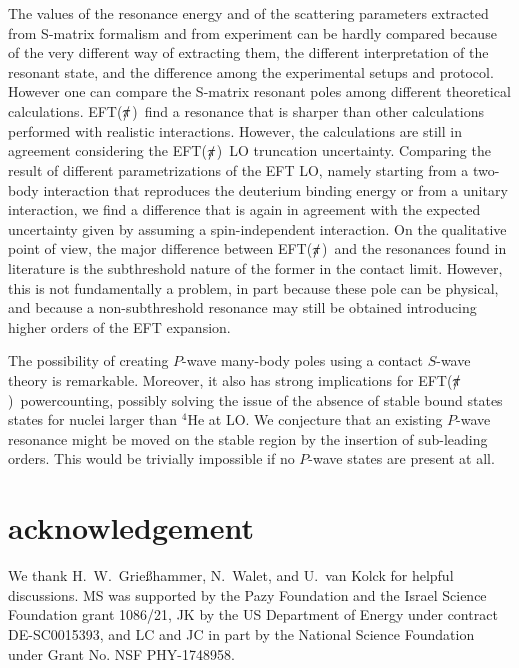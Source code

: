 \documentclass[5p,times]{elsarticle}
\newcommand{\eftnopi}{\mbox{EFT($\slashed{\pi}$) }}
\begin{document}
%
The values of the resonance energy and of the scattering parameters extracted from S-matrix formalism and from experiment can be hardly compared because of the very different way of extracting them, the different interpretation of the resonant state, and the difference among the experimental setups and protocol. 
However one can compare the S-matrix resonant poles among different theoretical calculations. \eftnopi find a resonance that is sharper than other calculations performed with realistic interactions. However, the calculations are still in agreement considering the \eftnopi LO truncation uncertainty. Comparing the result of different parametrizations of the EFT LO, namely starting from a two-body interaction that reproduces the deuterium binding energy or from a unitary interaction, we find a difference that is again in agreement with the expected uncertainty given by assuming a spin-independent interaction.
%
On the qualitative point of view, the major difference between \eftnopi and the resonances found in literature is the subthreshold nature of the former in the contact limit. 
However, this is not fundamentally a problem, in part because these pole can be physical\cite{formartinanyexample}, and because a non-subthreshold resonance may still be obtained introducing higher orders of the EFT expansion.
%

%
The possibility of creating $P$-wave many-body poles using a contact $S$-wave theory is remarkable. 
Moreover, it also has strong implications for \eftnopi powercounting, possibly solving the issue of the absence of stable bound states states for nuclei larger than $^4$He at LO. 
We conjecture that an existing $P$-wave resonance might be moved on the stable region by the insertion of sub-leading orders.
This would be trivially impossible if no $P$-wave states are present at all.

\section*{acknowledgement}
We thank H.~W.~Grie\ss hammer, N.~Walet, and U.~van Kolck for helpful discussions. 
MS was supported by the Pazy Foundation and the Israel Science Foundation grant 1086/21,
JK by the US Department of Energy under contract DE-SC0015393, and
LC and JC in part by the National Science Foundation under Grant No. NSF PHY-1748958.






\end{document}
